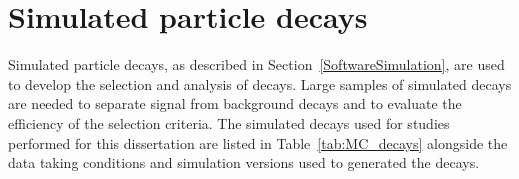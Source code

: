
\section{Simulated particle decays}
\label{sec:MCsamples}
Simulated particle decays, as described in Section~\ref{SoftwareSimulation}, are used to develop the selection and analysis of \bmumu decays. Large samples of simulated decays are needed to separate signal from background decays and to evaluate the efficiency of the selection criteria. 
The simulated decays used for studies performed for this dissertation are listed in Table~\ref{tab:MC_decays} alongside the data taking conditions and simulation versions used to generated the decays.


